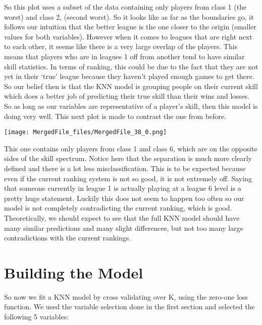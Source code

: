 \documentclass[letterpaper,10pt,english]{/usr/share/sphinx/texinputs/sphinxhowto}
\newenvironment{InvisibleVerbatim}
        {\begin{mdframed}[leftmargin=0.1\linewidth,innerleftmargin=3pt,innerrightmargin=3pt, userdefinedwidth=1\linewidth, linewidth=0pt, linecolor=white, usetwoside=false]}
        {\end{mdframed}}
\begin{document}
        
    
So this plot uses a subset of the data containing only players from
class 1 (the worst) and class 2, (second worst). So it looks like as far
as the boundaries go, it follows our intuition that the better league is
the one closer to the origin (smaller values for both variables).
However when it comes to leagues that are right next to each other, it
seems like there is a very large overlap of the players. This means that
players who are in leagues 1 off from another tend to have similar skill
statistics. In terms of ranking, this could be due to the fact that they
are not yet in their `true' league because they haven't played enough
games to get there. So our belief then is that the KNN model is grouping
people on their current skill which does a better job of predicting
their true skill than their wins and losses. So as long as our variables
are representative of a player's skill, then this model is doing very
well.
\newpage
This next plot is made to contrast the one from before.

    

        
        

            
                \begin{InvisibleVerbatim}
                \vspace{-0.5\baselineskip}
    \begin{center}
    \texttt{[image: MergedFile\_files/MergedFile\_38\_0.png]}
    \par
    \end{center}
    
            \end{InvisibleVerbatim}
            
        
    
This one contains only players from class 1 and class 6, which are on
the opposite sides of the skill spectrum. Notice here that the
separation is much more clearly defined and there is a lot less
misclassification. This is to be expected because even if the current
ranking system is not so good, it is not extremely off. Saying that
someone currently in league 1 is actually playing at a league 6 level is
a pretty huge statement. Luckily this does not seem to happen too often
so our model is not completely contradicting the current ranking, which
is good. Theoretically, we should expect to see that the full KNN model
should have many similar predictions and many slight differences, but
not too many large contradictions with the current rankings.\part{Building the Model}So now we fit a KNN model by cross validating over K, using the zero-one
loss function. We used the variable selection done in the first section
and selected the following 5 variables:
\end{document}
